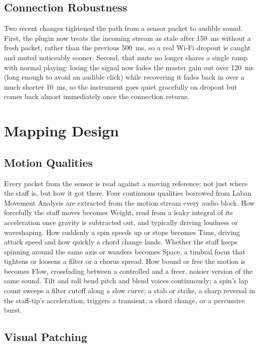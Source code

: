 \documentclass[a4paper,10pt,oneside]{article}
\begin{document}
\begin{sloppy}
\subsection{Connection Robustness}
\label{ssec:robustness}

Two recent changes tightened the path from a sensor packet to audible sound. First, the
plugin now treats the incoming stream as stale after 150~ms without a fresh packet,
rather than the previous 500~ms, so a real Wi-Fi dropout is caught and muted noticeably
sooner. Second, that mute no longer shares a single ramp with normal playing: losing the
signal now fades the master gain out over 120~ms (long enough to avoid an audible click)
while recovering it fades back in over a much shorter 10~ms, so the instrument goes
quiet gracefully on dropout but comes back almost immediately once the connection
returns.

\section{Mapping Design}
\label{sec:mapping}

\subsection{Motion Qualities}
\label{ssec:qualities}

Every packet from the sensor is read against a moving reference: not just where the
staff is, but how it got there. Four continuous qualities borrowed from Laban Movement
Analysis are extracted from the motion stream every audio block. How forcefully the
staff moves becomes Weight, read from a leaky integral of its acceleration once gravity
is subtracted out, and typically driving loudness or waveshaping. How suddenly a spin
speeds up or stops becomes Time, driving attack speed and how quickly a chord change
lands. Whether the staff keeps spinning around the same axis or wanders becomes Space, a
timbral focus that tightens or loosens a filter or a chorus spread. How bound or free
the motion is becomes Flow, crossfading between a controlled and a freer, noisier
version of the same sound. Tilt and roll bend pitch and blend voices continuously; a
spin's lap count sweeps a filter cutoff along a slow curve; a stab or strike, a sharp
reversal in the staff-tip's acceleration, triggers a transient, a chord change, or a
percussive burst.

\subsection{Visual Patching}
\label{ssec:patching}


\end{sloppy}
\end{document}
